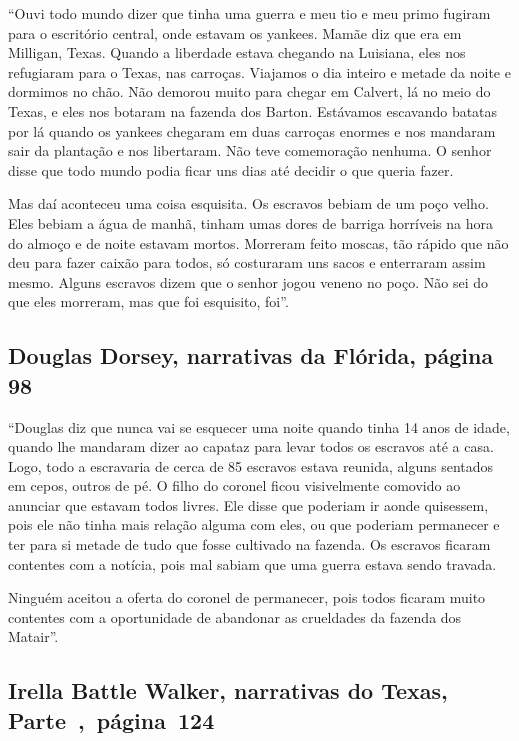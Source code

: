 ``Ouvi todo mundo dizer que tinha uma guerra e meu tio e meu primo
fugiram para o escritório central, onde estavam os yankees. Mamãe diz
que era em Milligan, Texas. Quando a liberdade estava chegando na
Luisiana, eles nos refugiaram para o Texas, nas carroças. Viajamos o dia
inteiro e metade da noite e dormimos no chão. Não demorou muito para
chegar em Calvert, lá no meio do Texas, e eles nos botaram na fazenda
dos Barton. Estávamos escavando batatas por lá quando os yankees
chegaram em duas carroças enormes e nos mandaram sair da plantação e nos
libertaram. Não teve comemoração nenhuma. O senhor disse que todo mundo
podia ficar uns dias até decidir o que queria fazer.

Mas daí aconteceu uma coisa esquisita. Os escravos bebiam de um poço
velho. Eles bebiam a água de manhã, tinham umas dores de barriga
horríveis na hora do almoço e de noite estavam mortos. Morreram feito
moscas, tão rápido que não deu para fazer caixão para todos, só
costuraram uns sacos e enterraram assim mesmo. Alguns escravos dizem que
o senhor jogou veneno no poço. Não sei do que eles morreram, mas que foi
esquisito, foi''.

\subsection{Douglas Dorsey, narrativas da Flórida, página 98} \label{ref72}

``Douglas diz que nunca vai se esquecer uma noite quando tinha 14 anos
de idade, quando lhe mandaram dizer ao capataz para levar todos os
escravos até a casa. Logo, todo a escravaria de cerca de 85 escravos
estava reunida, alguns sentados em cepos, outros de pé. O filho do
coronel ficou visivelmente comovido ao anunciar que estavam todos
livres. Ele disse que poderiam ir aonde quisessem, pois ele não tinha
mais relação alguma com eles, ou que poderiam permanecer e ter para si
metade de tudo que fosse cultivado na fazenda. Os escravos ficaram
contentes com a notícia, pois mal sabiam que uma guerra estava sendo
travada.

Ninguém aceitou a oferta do coronel de permanecer, pois todos ficaram
muito contentes com a oportunidade de abandonar as crueldades da fazenda
dos Matair''.

\subsection{Irella Battle Walker, narrativas do Texas, Parte~,~página~124}
\label{ref272}

